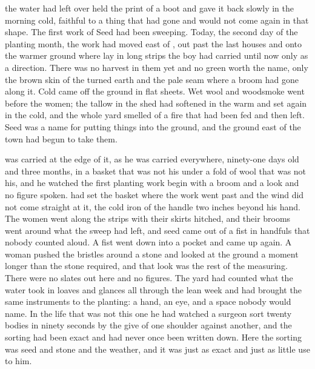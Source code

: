 
 the water had left over  held the print of a boot and gave it back slowly in the morning cold, faithful to a thing that had gone and would not come again in that shape. The first work of Seed had been sweeping. Today, the second day of the planting month, the work had moved east of , out past the last houses and onto the warmer ground where  lay in long strips the boy had carried until now only as a direction. There was no harvest in them yet and no green worth the name, only the brown skin of the turned earth and the pale seam where a broom had gone along it. Cold came off the ground in flat sheets. Wet wool and woodsmoke went before the women; the tallow in the shed had softened in the warm and set again in the cold, and the whole yard smelled of a fire that had been fed and then left. Seed was a name for putting things into the ground, and the ground east of the town had begun to take them.

 was carried at the edge of it, as he was carried everywhere, ninety-one days old and three months, in a basket that was not his under a fold of wool that was not his, and he watched the first planting work begin with a broom and a look and no figure spoken.  had set the basket where the work went past and the wind did not come straight at it, the cold iron of the handle two inches beyond his hand. The women went along the strips with their skirts hitched, and their brooms went around what the sweep had left, and seed came out of a fist in handfuls that nobody counted aloud. A fist went down into a pocket and came up again. A woman pushed the bristles around a stone and looked at the ground a moment longer than the stone required, and that look was the rest of the measuring. There were no slates out here and no figures. The yard had counted what the water took in loaves and glances all through the lean week and had brought the same instruments to the planting: a hand, an eye, and a space nobody would name. In the life that was not this one he had watched a surgeon sort twenty bodies in ninety seconds by the give of one shoulder against another, and the sorting had been exact and had never once been written down. Here the sorting was seed and stone and the weather, and it was just as exact and just as little use to him.

